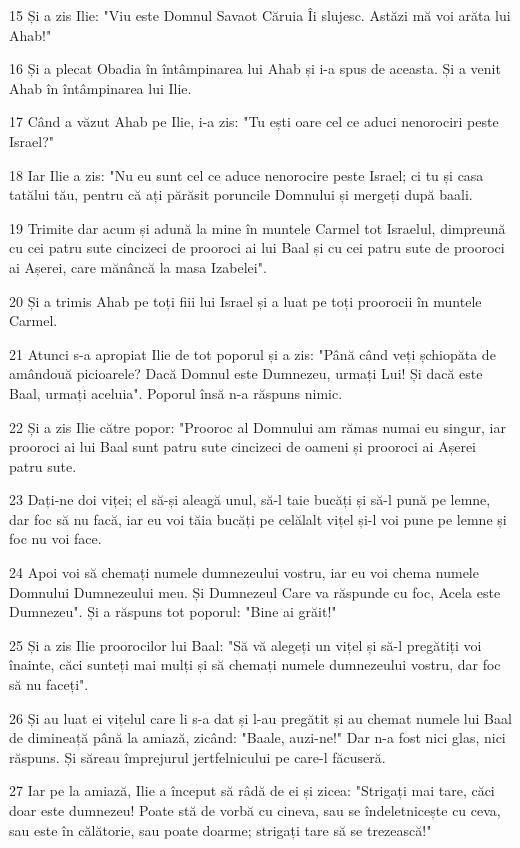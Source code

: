\par 15 Și a zis Ilie: "Viu este Domnul Savaot Căruia Îi slujesc. Astăzi mă voi arăta lui Ahab!"
\par 16 Și a plecat Obadia în întâmpinarea lui Ahab și i-a spus de aceasta. Și a venit Ahab în întâmpinarea lui Ilie.
\par 17 Când a văzut Ahab pe Ilie, i-a zis: "Tu ești oare cel ce aduci nenorociri peste Israel?"
\par 18 Iar Ilie a zis: "Nu eu sunt cel ce aduce nenorocire peste Israel; ci tu și casa tatălui tău, pentru că ați părăsit poruncile Domnului și mergeți după baali.
\par 19 Trimite dar acum și adună la mine în muntele Carmel tot Israelul, dimpreună cu cei patru sute cincizeci de prooroci ai lui Baal și cu cei patru sute de prooroci ai Așerei, care mănâncă la masa Izabelei".
\par 20 Și a trimis Ahab pe toți fiii lui Israel și a luat pe toți proorocii în muntele Carmel.
\par 21 Atunci s-a apropiat Ilie de tot poporul și a zis: "Până când veți șchiopăta de amândouă picioarele? Dacă Domnul este Dumnezeu, urmați Lui! Și dacă este Baal, urmați aceluia". Poporul însă n-a răspuns nimic.
\par 22 Și a zis Ilie către popor: "Prooroc al Domnului am rămas numai eu singur, iar prooroci ai lui Baal sunt patru sute cincizeci de oameni și prooroci ai Așerei patru sute.
\par 23 Dați-ne doi viței; el să-și aleagă unul, să-l taie bucăți și să-l pună pe lemne, dar foc să nu facă, iar eu voi tăia bucăți pe celălalt vițel și-l voi pune pe lemne și foc nu voi face.
\par 24 Apoi voi să chemați numele dumnezeului vostru, iar eu voi chema numele Domnului Dumnezeului meu. Și Dumnezeul Care va răspunde cu foc, Acela este Dumnezeu". Și a răspuns tot poporul: "Bine ai grăit!"
\par 25 Și a zis Ilie proorocilor lui Baal: "Să vă alegeți un vițel și să-l pregătiți voi înainte, căci sunteți mai mulți și să chemați numele dumnezeului vostru, dar foc să nu faceți".
\par 26 Și au luat ei vițelul care li s-a dat și l-au pregătit și au chemat numele lui Baal de dimineață până la amiază, zicând: "Baale, auzi-ne!" Dar n-a fost nici glas, nici răspuns. Și săreau împrejurul jertfelnicului pe care-l făcuseră.
\par 27 Iar pe la amiază, Ilie a început să râdă de ei și zicea: "Strigați mai tare, căci doar este dumnezeu! Poate stă de vorbă cu cineva, sau se îndeletnicește cu ceva, sau este în călătorie, sau poate doarme; strigați tare să se trezească!"
